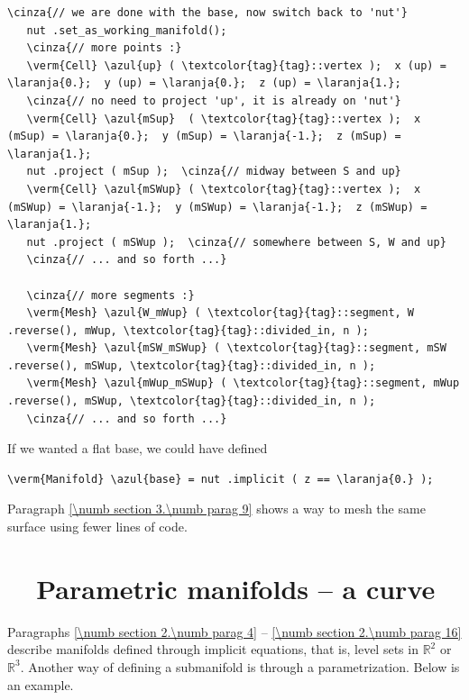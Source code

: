 \begin{Verbatim}[commandchars=\\\{\},formatcom=\small\tt,frame=single,
   label=parag-\ref{\numb section 2.\numb parag 16}.cpp,rulecolor=\color{coment},
   baselinestretch=0.94,framesep=2mm]
   \cinza{// we are done with the base, now switch back to 'nut'}
   nut .set_as_working_manifold();
   \cinza{// more points :}
   \verm{Cell} \azul{up} ( \textcolor{tag}{tag}::vertex );  x (up) = \laranja{0.};  y (up) = \laranja{0.};  z (up) = \laranja{1.};
   \cinza{// no need to project 'up', it is already on 'nut'}
   \verm{Cell} \azul{mSup}  ( \textcolor{tag}{tag}::vertex );  x (mSup) = \laranja{0.};  y (mSup) = \laranja{-1.};  z (mSup) = \laranja{1.};
   nut .project ( mSup );  \cinza{// midway between S and up}
   \verm{Cell} \azul{mSWup} ( \textcolor{tag}{tag}::vertex );  x (mSWup) = \laranja{-1.};  y (mSWup) = \laranja{-1.};  z (mSWup) = \laranja{1.};
   nut .project ( mSWup );  \cinza{// somewhere between S, W and up}
   \cinza{// ... and so forth ...}

   \cinza{// more segments :}
   \verm{Mesh} \azul{W_mWup} ( \textcolor{tag}{tag}::segment, W .reverse(), mWup, \textcolor{tag}{tag}::divided_in, n );
   \verm{Mesh} \azul{mSW_mSWup} ( \textcolor{tag}{tag}::segment, mSW .reverse(), mSWup, \textcolor{tag}{tag}::divided_in, n );
   \verm{Mesh} \azul{mWup_mSWup} ( \textcolor{tag}{tag}::segment, mWup .reverse(), mSWup, \textcolor{tag}{tag}::divided_in, n );
   \cinza{// ... and so forth ...}
\end{Verbatim}

If we wanted a flat base, we could have defined

\begin{Verbatim}[commandchars=\\\{\},formatcom=\small\tt,baselinestretch=0.94]
   \verm{Manifold} \azul{base} = nut .implicit ( z == \laranja{0.} );
\end{Verbatim}

Paragraph \ref{\numb section 3.\numb parag 9} shows a way to mesh the same surface using
fewer lines of code.


\section{~~Parametric manifolds -- a curve}\label{\numb section 2.\numb parag 17}

Paragraphs \ref{\numb section 2.\numb parag 4} -- \ref{\numb section 2.\numb parag 16} describe
manifolds defined through implicit equations, that is, level sets in $ \mathbb{R}^2 $ or
$ \mathbb{R}^3 $.
Another way of defining a submanifold is through a parametrization.
Below is an example.

